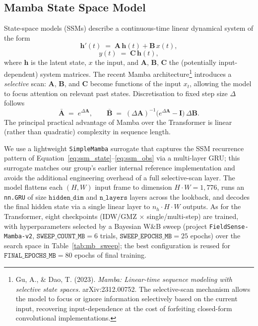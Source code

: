 \documentclass[12pt, a4paper]{article}
\begin{document}
\subsection{Mamba State Space Model}\label{sec:mamba}

State-space models (SSMs) describe a continuous-time linear dynamical
system of the form
\begin{equation}
  \mathbf{h}'(t) \;=\; \mathbf{A}\,\mathbf{h}(t) + \mathbf{B}\,x(t), \label{eq:ssm_state}
\end{equation}
\begin{equation}
  y(t) \;=\; \mathbf{C}\,\mathbf{h}(t), \label{eq:ssm_obs}
\end{equation}
where \(\mathbf{h}\) is the latent state, \(x\) the input, and
\(\mathbf{A}\), \(\mathbf{B}\), \(\mathbf{C}\) the (potentially
input-dependent) system matrices. The recent Mamba
architecture\footnote{Gu, A., \& Dao, T. (2023). \emph{Mamba:
Linear-time sequence modeling with selective state spaces.}
arXiv:2312.00752. The selective-scan mechanism allows the model to
focus or ignore information selectively based on the current input,
recovering input-dependence at the cost of forfeiting closed-form
convolutional implementations.} \cite{gu2023mamba} introduces a
\emph{selective} scan: \(\mathbf{A}\), \(\mathbf{B}\), and \(\mathbf{C}\)
become functions of the input \(x_t\), allowing the model to focus
attention on relevant past states. Discretisation to fixed step size
\(\Delta\) follows
\begin{equation}
  \bar{\mathbf{A}} \;=\; e^{\Delta\mathbf{A}},
  \qquad
  \bar{\mathbf{B}} \;=\; (\Delta\mathbf{A})^{-1}\bigl(e^{\Delta\mathbf{A}} - \mathbf{I}\bigr)\,\Delta\mathbf{B}.
  \label{eq:mamba_disc}
\end{equation}
The principal practical advantage of Mamba over the Transformer is
linear (rather than quadratic) complexity in sequence length.

We use a lightweight \texttt{SimpleMamba} surrogate that captures the
SSM recurrence pattern of Equation~\eqref{eq:ssm_state}--\eqref{eq:ssm_obs}
via a multi-layer GRU; this surrogate matches our group's earlier
internal reference implementation and avoids the additional engineering
overhead of a full selective-scan layer. The model flattens each
\((H, W)\) input frame to dimension \(H\cdot W = 1{,}776\), runs an
\texttt{nn.GRU} of size \(\texttt{hidden\_dim}\) and \(\texttt{n\_layers}\)
layers across the lookback, and decodes the final hidden state via a
single linear layer to \(n_h\cdot H\cdot W\) outputs. As for the
Transformer, eight checkpoints (IDW/GMZ \(\times\) single/multi-step) are
trained, with hyperparameters selected by a Bayesian W\&B sweep
(project \texttt{FieldSense-Mamba-v2}, \(\texttt{SWEEP\_COUNT\_MB} = 6\)
trials, \(\texttt{SWEEP\_EPOCHS\_MB} = 25\) epochs) over the search
space in Table~\ref{tab:mb_sweep}; the best configuration is reused for
\(\texttt{FINAL\_EPOCHS\_MB} = 80\) epochs of final training.
\end{document}
